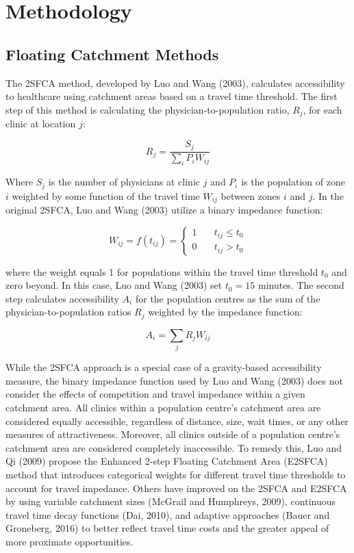 \documentclass[]{elsarticle} %
\begin{document}
\hypertarget{methodology}{%
\section{Methodology}\label{methodology}}

\hypertarget{floating-catchment-methods}{%
\subsection{Floating Catchment
Methods}\label{floating-catchment-methods}}

The 2SFCA method, developed by Luo and Wang (2003), calculates
accessibility to healthcare using catchment areas based on a travel time
threshold. The first step of this method is calculating the
physician-to-population ratio, \(R_j\), for each clinic at location
\(j\):

\[
R_j = \frac{S_j}{\sum_i{P_iW_{ij}}}
\]

Where \(S_j\) is the number of physicians at clinic \(j\) and \(P_i\) is
the population of zone \(i\) weighted by some function of the travel
time \(W_{ij}\) between zones \(i\) and \(j\). In the original 2SFCA,
Luo and Wang (2003) utilize a binary impedance function:

\[
W_{ij} = f(t_{ij}) = \left\{
        \begin{array}{ll}
            1 & \quad t_{ij} \leq t_0 \\
            0 & \quad t_{ij} > t_0
        \end{array}
    \right.
\]

where the weight equals 1 for populations within the travel time
threshold \(t_0\) and zero beyond. In this case, Luo and Wang (2003) set
\(t_0 = 15\) minutes. The second step calculates accessibility \(A_i\)
for the population centres as the sum of the physician-to-population
ratios \(R_j\) weighted by the impedance function:

\[
A_i = \sum_j{R_jW_{ij}}
\]

While the 2SFCA approach is a special case of a gravity-based
accessibility measure, the binary impedance function used by Luo and
Wang (2003) does not consider the effects of competition and travel
impedance within a given catchment area. All clinics within a population
centre's catchment area are considered equally accessible, regardless of
distance, size, wait times, or any other measures of attractiveness.
Moreover, all clinics outside of a population centre's catchment area
are considered completely inaccessible. To remedy this, Luo and Qi
(2009) propose the Enhanced 2-step Floating Catchment Area (E2SFCA)
method that introduces categorical weights for different travel time
thresholds to account for travel impedance. Others have improved on the
2SFCA and E2SFCA by using variable catchment sizes (McGrail and
Humphreys, 2009), continuous travel time decay functions (Dai, 2010),
and adaptive approaches (Bauer and Groneberg, 2016) to better reflect
travel time costs and the greater appeal of more proximate
opportunities.
\end{document}

